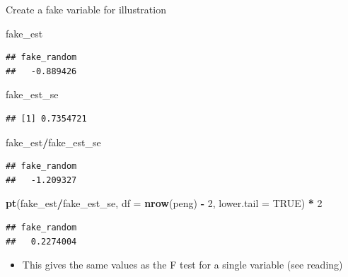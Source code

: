 \documentclass[
  ignorenonframetext,
]{beamer}
\newenvironment{Shaded}{\begin{snugshade}}{\end{snugshade}}
\newcommand{\DataTypeTok}[1]{\textcolor[rgb]{0.13,0.29,0.53}{#1}}
\newcommand{\DecValTok}[1]{\textcolor[rgb]{0.00,0.00,0.81}{#1}}
\newcommand{\KeywordTok}[1]{\textcolor[rgb]{0.13,0.29,0.53}{\textbf{#1}}}
\newcommand{\NormalTok}[1]{#1}
\newcommand{\OperatorTok}[1]{\textcolor[rgb]{0.81,0.36,0.00}{\textbf{#1}}}
\newcommand{\OtherTok}[1]{\textcolor[rgb]{0.56,0.35,0.01}{#1}}
\newcommand{\StringTok}[1]{\textcolor[rgb]{0.31,0.60,0.02}{#1}}
\providecommand{\tightlist}{%
  \setlength{\itemsep}{0pt}\setlength{\parskip}{0pt}}
\begin{document}
\begin{frame}[fragile]{Create a fake variable for illustration}
\protect\hypertarget{create-a-fake-variable-for-illustration}{}

\begin{Shaded}
\begin{Highlighting}[]
\NormalTok{fake_est}
\end{Highlighting}
\end{Shaded}

\begin{verbatim}
## fake_random 
##   -0.889426
\end{verbatim}

\begin{Shaded}
\begin{Highlighting}[]
\NormalTok{fake_est_se}
\end{Highlighting}
\end{Shaded}

\begin{verbatim}
## [1] 0.7354721
\end{verbatim}

\begin{Shaded}
\begin{Highlighting}[]
\NormalTok{fake_est}\OperatorTok{/}\NormalTok{fake_est_se}
\end{Highlighting}
\end{Shaded}

\begin{verbatim}
## fake_random 
##   -1.209327
\end{verbatim}

\begin{Shaded}
\begin{Highlighting}[]
\KeywordTok{pt}\NormalTok{(fake_est}\OperatorTok{/}\NormalTok{fake_est_se, }\DataTypeTok{df =} \KeywordTok{nrow}\NormalTok{(peng) }\OperatorTok{-}\StringTok{ }\DecValTok{2}\NormalTok{, }\DataTypeTok{lower.tail =} \OtherTok{TRUE}\NormalTok{) }\OperatorTok{*}\StringTok{ }\DecValTok{2}
\end{Highlighting}
\end{Shaded}

\begin{verbatim}
## fake_random 
##   0.2274004
\end{verbatim}

\begin{itemize}
\tightlist
\item
  This gives the same values as the F test for a single variable (see
  reading)
\end{itemize}

\end{frame}
\end{document}
